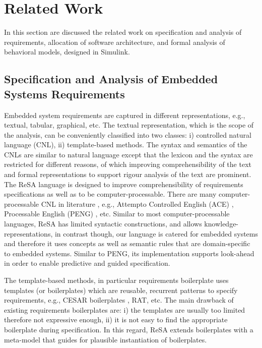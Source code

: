 \chapter{Related Work}
In this section are discussed the related work on specification and analysis of requirements, allocation of software architecture, and formal analysis of behavioral models, designed in Simulink.

\section{Specification and Analysis of Embedded Systems Requirements}
Embedded system requirements are captured in different representations, e.g., textual, tabular, graphical, etc. The textual representation, which is the scope of the analysis, can be conveniently classified into two classes: i) controlled natural language (CNL), ii) template-based methods.  The syntax and semantics of the CNLs are similar to natural language except that the lexicon and the syntax are restricted for different reasons, of which improving comprehensibility of the text and formal representations to support rigour analysis of the text are prominent. The ReSA language is designed to improve comprehensibility of requirements specifications as well as to be computer-processable. There are many computer-processable CNL in literature \cite{Kuhn2014ALanguages}, e.g., Attempto Controlled English (ACE) \cite{attempto96}, Processable English (PENG) \cite{Schwitter2002EnglishLanguage}, etc. Similar to most computer-processable languages, ReSA has limited syntactic constructions, and allows knowledge-representations, in contrast though, our language is catered for embedded systems and therefore it uses concepts as well as semantic rules that are domain-specific to embedded systems. Similar to PENG, its implementation supports look-ahead in order to enable predictive and guided specification.

The template-based methods, in particular requirements boilerplate uses templates (or boilerplates) which are reusable, recurrent patterns to specify requirements, e.g., CESAR boilerplates \cite{Farfeleder2011DODT:Development}, RAT, etc. The main drawback of existing requirements boilerplates are: i) the templates are usually too limited therefore not expressive enough, ii) it is not easy to find the appropriate boilerplate during specification. In this regard, ReSA extends boilerplates with a meta-model that guides for plausible instantiation of boilerplates.


